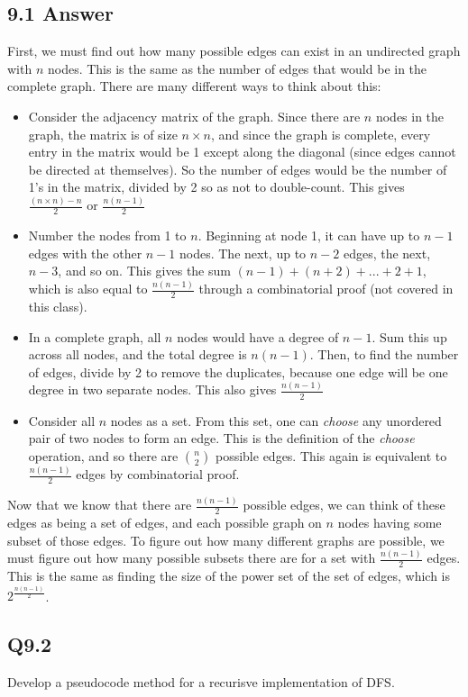 \documentclass{article}
\begin{document}
\subsection*{9.1 Answer}
First, we must find out how many possible edges can exist in an undirected graph with $n$ nodes. This is the same as the number of edges that would be in the complete graph. There are many different ways to think about this:
\begin{itemize}
    \item Consider the adjacency matrix of the graph. Since there are $n$ nodes in the graph, the matrix is of size $n\times n$, and since the graph is complete, every entry in the matrix would be 1 except along the diagonal (since edges cannot be directed at themselves). So the number of edges would be the number of 1's in the matrix, divided by 2 so as not to double-count. This gives $\frac{(n\times n)-n}{2}$ or $\frac{n(n-1)}{2}$
    \item Number the nodes from 1 to $n$. Beginning at node 1, it can have up to $n-1$ edges with the other $n-1$ nodes. The next, up to $n-2$ edges, the next, $n-3$, and so on. This gives the sum $(n-1)+(n+2)+...+2+1$, which is also equal to $\frac{n(n-1)}{2}$ through a combinatorial proof (not covered in this class).
    \item In a complete graph, all $n$ nodes would have a degree of $n-1$. Sum this up across all nodes, and the total degree is $n(n-1)$. Then, to find the number of edges, divide by 2 to remove the duplicates, because one edge will be one degree in two separate nodes. This also gives $\frac{n(n-1)}{2}$
    \item Consider all $n$ nodes as a set. From this set, one can \textit{choose} any unordered pair of two nodes to form an edge. This is the definition of the \textit{choose} operation, and so there are $n\choose 2$ possible edges. This again is equivalent to $\frac{n(n-1)}{2}$ edges by combinatorial proof.
\end{itemize}
Now that we know that there are $\frac{n(n-1)}{2}$ possible edges, we can think of these edges as being a set of edges, and each possible graph on $n$ nodes having some subset of those edges. To figure out how many different graphs are possible, we must figure out how many possible subsets there are for a set with $\frac{n(n-1)}{2}$ edges. This is the same as finding the size of the power set of the set of edges, which is $2^{\frac{n(n-1)}{2}}$.
\newpage

\subsection*{Q9.2}
Develop a pseudocode method for a recurisve implementation of DFS.
\end{document}
